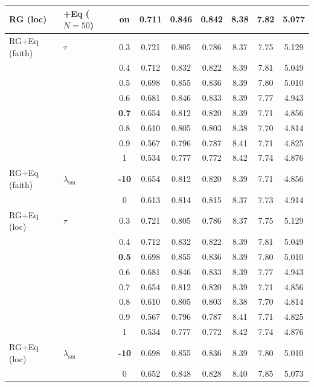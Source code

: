 \begin{longtable}{@{}l l c c c c c c c@{}}
\midrule
RG (loc) & +Eq ($N{=}50$) & on & 0.711 & 0.846 & 0.842 & 8.38 & 7.82 & 5.077 \\
\midrule
RG+Eq (faith) & $\tau$ & 0.3 & 0.721 & 0.805 & 0.786 & 8.37 & 7.75 & 5.129 \\
 &  & 0.4 & 0.712 & 0.832 & 0.822 & 8.39 & 7.81 & 5.049 \\
 &  & 0.5 & 0.698 & 0.855 & 0.836 & 8.39 & 7.80 & 5.010 \\
 &  & 0.6 & 0.681 & 0.846 & 0.833 & 8.39 & 7.77 & 4.943 \\
 &  & \textbf{0.7} & 0.654 & 0.812 & 0.820 & 8.39 & 7.71 & 4.856 \\
 &  & 0.8 & 0.610 & 0.805 & 0.803 & 8.38 & 7.70 & 4.814 \\
 &  & 0.9 & 0.567 & 0.796 & 0.787 & 8.41 & 7.71 & 4.825 \\
 &  & 1 & 0.534 & 0.777 & 0.772 & 8.42 & 7.74 & 4.876 \\
\midrule
RG+Eq (faith) & $\lambda_{\mathrm{sm}}$ & \textbf{{-}10} & 0.654 & 0.812 & 0.820 & 8.39 & 7.71 & 4.856 \\
 &  & 0 & 0.613 & 0.814 & 0.815 & 8.37 & 7.73 & 4.914 \\
\midrule
RG+Eq (loc) & $\tau$ & 0.3 & 0.721 & 0.805 & 0.786 & 8.37 & 7.75 & 5.129 \\
 &  & 0.4 & 0.712 & 0.832 & 0.822 & 8.39 & 7.81 & 5.049 \\
 &  & \textbf{0.5} & 0.698 & 0.855 & 0.836 & 8.39 & 7.80 & 5.010 \\
 &  & 0.6 & 0.681 & 0.846 & 0.833 & 8.39 & 7.77 & 4.943 \\
 &  & 0.7 & 0.654 & 0.812 & 0.820 & 8.39 & 7.71 & 4.856 \\
 &  & 0.8 & 0.610 & 0.805 & 0.803 & 8.38 & 7.70 & 4.814 \\
 &  & 0.9 & 0.567 & 0.796 & 0.787 & 8.41 & 7.71 & 4.825 \\
 &  & 1 & 0.534 & 0.777 & 0.772 & 8.42 & 7.74 & 4.876 \\
\midrule
RG+Eq (loc) & $\lambda_{\mathrm{sm}}$ & \textbf{{-}10} & 0.698 & 0.855 & 0.836 & 8.39 & 7.80 & 5.010 \\
 &  & 0 & 0.652 & 0.848 & 0.828 & 8.40 & 7.85 & 5.073 \\
\end{longtable}
